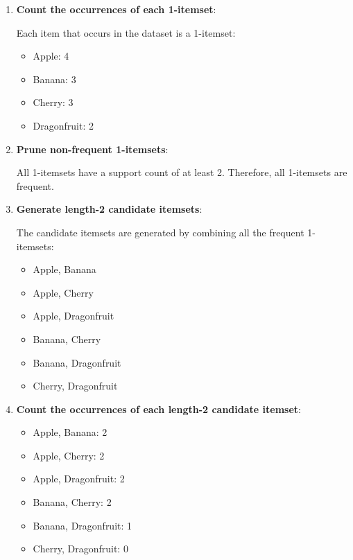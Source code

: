\documentclass[
english,
smallborders
]{i6prcsht}
\begin{document}
\begin{solution}
	\begin{enumerate}
		\item \textbf{Count the occurrences of each 1-itemset}:

		      Each item that occurs in the dataset is a 1-itemset:

		      \begin{itemize}
			      \item Apple: 4
			      \item Banana: 3
			      \item Cherry: 3
			      \item Dragonfruit: 2
		      \end{itemize}

		\item \textbf{Prune non-frequent 1-itemsets}:

		      All 1-itemsets have a support count of at least 2. Therefore, all 1-itemsets are frequent.

		\item \textbf{Generate length-2 candidate itemsets}:

		      The candidate itemsets are generated by combining all the frequent 1-itemsets:

		      \begin{itemize}
			      \item Apple, Banana
			      \item Apple, Cherry
			      \item Apple, Dragonfruit
			      \item Banana, Cherry
			      \item Banana, Dragonfruit
			      \item Cherry, Dragonfruit
		      \end{itemize}

		\item \textbf{Count the occurrences of each length-2 candidate itemset}:

		      \begin{itemize}
			      \item Apple, Banana: 2
			      \item Apple, Cherry: 2
			      \item Apple, Dragonfruit: 2
			      \item Banana, Cherry: 2
			      \item Banana, Dragonfruit: 1
			      \item Cherry, Dragonfruit: 0
		      \end{itemize}


\end{enumerate}
\end{solution}
\end{document}
